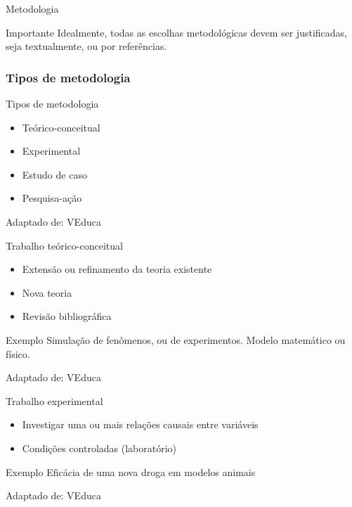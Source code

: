 \documentclass{beamer}
\begin{document}
\begin{frame}{Metodologia}
  \begin{block}{Importante}
    \footnotesize
    Idealmente, todas as escolhas metodológicas devem ser
    justificadas, seja textualmente, ou por referências.
  \end{block}
\end{frame}

\subsubsection{Tipos de metodologia}

\begin{frame}{Tipos de metodologia}
  \begin{itemize}
    \footnotesize
  \item<1-> Teórico-conceitual
  \bigskip
  \item<1-> Experimental
  \bigskip
  \item<1-> Estudo de caso
  \bigskip
  \item<1-> Pesquisa-ação
  \end{itemize}

  \vfill
  \scriptsize
  Adaptado de: VEduca
\end{frame}

\begin{frame}{Trabalho teórico-conceitual}
  \begin{itemize}
    \footnotesize
  \item Extensão ou refinamento da teoria existente
  \item Nova teoria
  \item Revisão bibliográfica
  \end{itemize}
  \begin{exampleblock}{Exemplo}
    \scriptsize
    Simulação de fenômenos, ou de experimentos. Modelo matemático ou físico.
  \end{exampleblock}

  \vfill
  \scriptsize
  Adaptado de: VEduca
\end{frame}

\begin{frame}{Trabalho experimental}
  \begin{itemize}
    \footnotesize
  \item Investigar uma ou mais relações causais entre variáveis
  \item Condições controladas (laboratório)
  \end{itemize}
  \begin{exampleblock}{Exemplo}
    \scriptsize
    Eficácia de uma nova droga em modelos animais
  \end{exampleblock}

  \vfill
  \scriptsize
  Adaptado de: VEduca
\end{frame}
\end{document}
